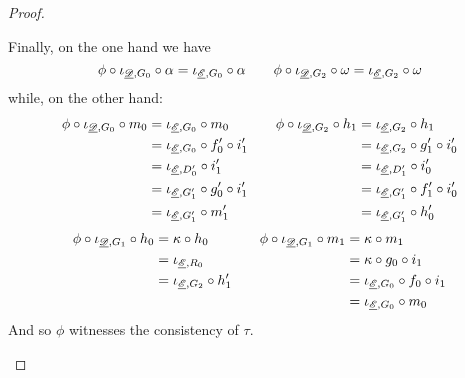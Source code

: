 \begin{proof}
\begin{enumerate}
Finally, on the one hand we have
\[\phi \circ \iota_{\underline{\mathscr{D}}, G_0}\circ \alpha=\iota_{\underline{\mathscr{E}}, G_0}\circ \alpha \qquad \phi \circ \iota_{\underline{\mathscr{D}}, G_2}\circ \omega=\iota_{\underline{\mathscr{E}}, G_2}\circ \omega\]
while, on the other hand:
\[\begin{split}
	\phi\circ \iota_{\underline{\mathscr{D}}, G_0}\circ m_0&=\iota_{\underline{\mathscr{E}}, G_0}\circ m_0\\&=\iota_{\underline{\mathscr{E}}, G_0}\circ f'_0\circ i'_1\\&=\iota_{\underline{\mathscr{E}}, D'_0}\circ i'_1\\&=\iota_{\underline{\mathscr{E}}, G'_1}\circ g'_0\circ i'_1\\&=\iota_{\underline{\mathscr{E}}, G'_1}\circ m'_1
\end{split} \qquad \begin{split}
\phi \circ \iota_{\underline{\mathscr{D}}, G_2}\circ h_1&=\iota_{\underline{\mathscr{E}}, G_2}\circ h_1\\&=\iota_{\underline{\mathscr{E}}, G_2}\circ g'_1\circ i'_0\\&=\iota_{\underline{\mathscr{E}}, D'_1}\circ i'_0\\&=\iota_{\underline{\mathscr{E}}, G'_1}\circ f'_1 \circ i'_0\\&=\iota_{\underline{\mathscr{E}}, G'_1}\circ h'_0
\end{split} \]
\[	\begin{split}
	\phi\circ \iota_{\underline{\mathscr{D}}, G_1}\circ h_0&=\kappa \circ h_0\\&=\iota_{\underline{\mathscr{E}}, R_0}\\&=\iota_{\underline{\mathscr{E}}, G_2}\circ h'_1\\&
\end{split} \qquad \begin{split}
\phi\circ \iota_{\underline{\mathscr{D}}, G_1}\circ m_1&=\kappa\circ m_1\\&=\kappa\circ g_0\circ i_1\\&= \iota_{\underline{\mathscr{E}}, G_0} \circ f_0 \circ i_1\\&=\iota_{\underline{\mathscr{E}}, G_0}\circ m_0
\end{split}\]
	And so $\phi$ witnesses the consistency of $\tau$. \qedhere 
	\end{enumerate}
\end{proof}


